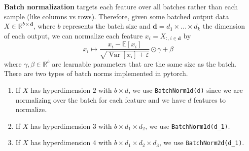 \documentclass{article}
\DeclareMathOperator{\Var}{Var}
\begin{document}
  \begin{definition}
    \textbf{Batch normalization} targets each feature over all batches rather than each sample (like columns vs rows). Therefore, given some batched output data $X \in \mathbb{R}^{b \times \mathbf{d}}$, where $b$ represents the batch size and $\mathbf{d} = d_1 \times \ldots \times d_k$ the dimension of each output, we can normalize each feature $x_i = X_{:,i \in \mathbf{d}}$ by 
    \begin{equation}
      x_i \mapsto \frac{x_i - \mathbb{E}[x_i]}{\sqrt{\Var[x_i] + \varepsilon}} \odot \gamma + \beta
    \end{equation}
    where $\gamma, \beta \in \mathbb{R}^b$ are learnable parameters that are the same size as the batch. There are two types of batch norms implemented in pytorch. 
    \begin{enumerate}
      \item If $X$ has hyperdimension $2$ with $b \times d$, we use \texttt{BatchNorm1d(d)} since we are normalizing over the batch for each feature and we have $d$ features to normalize. 
      \item If $X$ has hyperdimension $3$ with $b \times d_1 \times d_2$, we use \texttt{BatchNorm1d(d\_1)}. 
      \item If $X$ has hyperdimension $4$ with $b \times d_1 \times d_2 \times d_3$, we use \texttt{BatchNorm2d(d\_1)}. 
    \end{enumerate}
  \end{definition}
\end{document}
